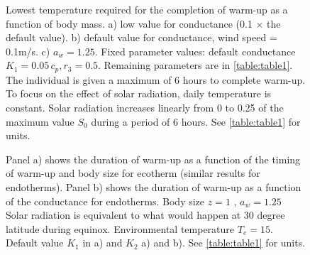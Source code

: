 \begin{figure}[H]
\begin{center}
\caption{
	Lowest temperature required for the completion of warm-up as a function of body mass.
	a)  low value for conductance (0.1 $\times$ the default value).
	b) default value for conductance, wind speed  = 0.1m/s.
	c)  $a_w = 1.25$.
	Fixed parameter values: default conductance $K_1 = 0.05 \, c_p, r_3 = 0.5$.
	Remaining parameters are in \cref{table:table1}.
	The individual is given a maximum of 6 hours to complete warm-up.
	To focus on the effect of solar radiation, daily temperature is constant.
	Solar radiation increases linearly from 0 to 0.25 of the maximum value $S_0$ during a period of 6 hours.
	See \cref{table:table1} for units.
}
\label{fig3}
\end{center}
\end{figure}
%
\begin{figure}[H]
\begin{center}
\caption{
	Panel a) shows the duration of warm-up as a function of the timing of warm-up and body size for ecotherm (similar results for endotherms).
	Panel b) shows the duration of warm-up as a function of the conductance for endotherms. Body size $z = 1$ , $a_w = 1.25$
	Solar radiation is equivalent to what would happen at 30 degree latitude during equinox.
	Environmental temperature $ T_e = 15$.
	Default value $K_1$ in a) and $K_2$ a) and b).
	See \cref{table:table1} for units.
}
\label{fig4}
\end{center}
\end{figure}
\vspace{-0.8cm}
